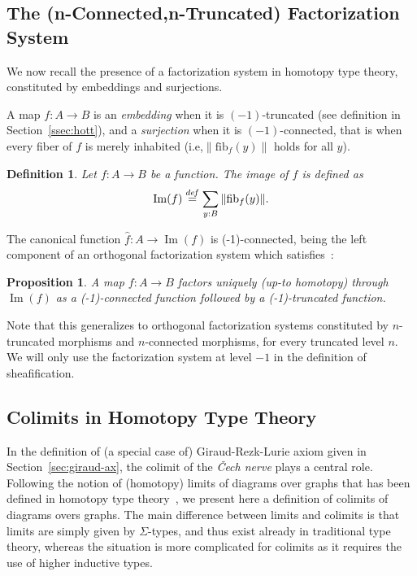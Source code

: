 \documentclass[conference]{IEEEtran}
\newtheorem{prop}[thm]{Proposition}
\newtheorem{defi}[thm]{Definition}
\newcommand \defeq {\overset{de\hspace{-0.2ex}f}{=}}
\newcommand{\ie}{i.e,\xspace}
\DeclareMathOperator{\im}{Im}
\newcommand \fib[2] {\mathrm{fib}_{#1}(#2)}
\begin{document}
\subsection{The (n-Connected,n-Truncated) Factorization System}
\label{sec:epi-mono-fact}

We now recall the presence of a factorization system in homotopy type
theory, constituted by embeddings and surjections.

A map $f:A\to B$ is an \emph{embedding} when it is $(-1)$-truncated
(see definition in Section~\ref{ssec:hott}), and a \emph{surjection}
when it is $(-1)$-connected, that is when every fiber of $f$ is merely
inhabited (\ie $\|\fib f y\|$ holds for all $y$).

\begin{defi}
  Let $f:A\to B$ be a function. The {\em image} of $f$ is defined as 
  $$\im(f) \defeq \sum_{y:B} \|\fib f y\|.$$
\end{defi}

The canonical function $\hat f : A \to \im(f)$ is (-1)-connected,
being the left component of an orthogonal factorization system which
satisfies~\cite[Lemma 7.6.4]{hottbook}:
\begin{prop}
  A map $f:A\to B$ factors uniquely (up-to homotopy) through
  $\im(f)$ as a (-1)-connected function followed by a (-1)-truncated
  function.
\end{prop}

Note that this generalizes to orthogonal factorization systems
constituted by $n$-truncated morphisms and $n$-connected morphisms, for
every truncated level $n$. We will only use the factorization system
at level  $-1$ in the definition of sheafification.

\subsection{Colimits in Homotopy Type Theory }
\label{sec:colim-homot-type}

In the definition of (a special case of) Giraud-Rezk-Lurie axiom given in
Section~\ref{sec:giraud-ax}, the colimit of the {\em \v{C}ech nerve}
plays a central role.
% 
Following the notion of (homotopy) limits of diagrams over graphs that
has been defined in homotopy type theory~\cite{lumsdaine}, we present
here a definition of colimits of diagrams overs graphs. 
%
The main difference between limits and colimits is that limits are
simply given by $\Sigma$-types, and thus exist already in traditional
type theory, whereas the situation is more complicated for colimits as
it requires the use of higher inductive types.
\end{document}
